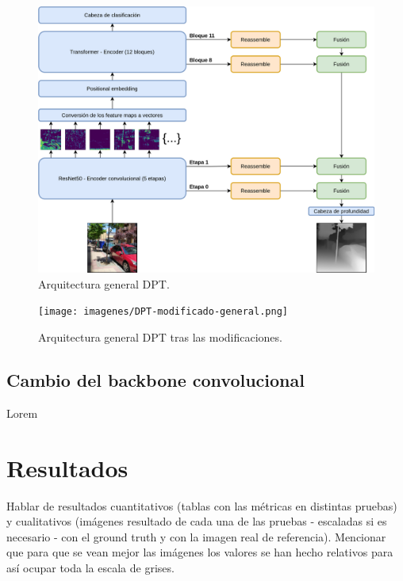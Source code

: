 \documentclass[a4paper, 11pt]{article}
\begin{document}
\begin{figure}[H]
\centering
\includegraphics[width=\textwidth]{imagenes/DPT-general.png}
\caption{Arquitectura general DPT.}
\label{fig:dpt-general}
\end{figure}

\begin{figure}[H]
\centering
\texttt{[image: imagenes/DPT-modificado-general.png]}
\caption{Arquitectura general DPT tras las modificaciones.}
\label{fig:dpt-mod-general}
\end{figure}

\subsection{Cambio del backbone convolucional}
Lorem



\clearpage
\section{Resultados}

Hablar de resultados cuantitativos (tablas con las métricas en distintas pruebas) y cualitativos (imágenes resultado de cada una de las pruebas - escaladas si es necesario - con el ground truth y con la imagen real de referencia). Mencionar que para que se vean mejor las imágenes los valores se han hecho relativos para así ocupar toda la escala de grises.
\end{document}
